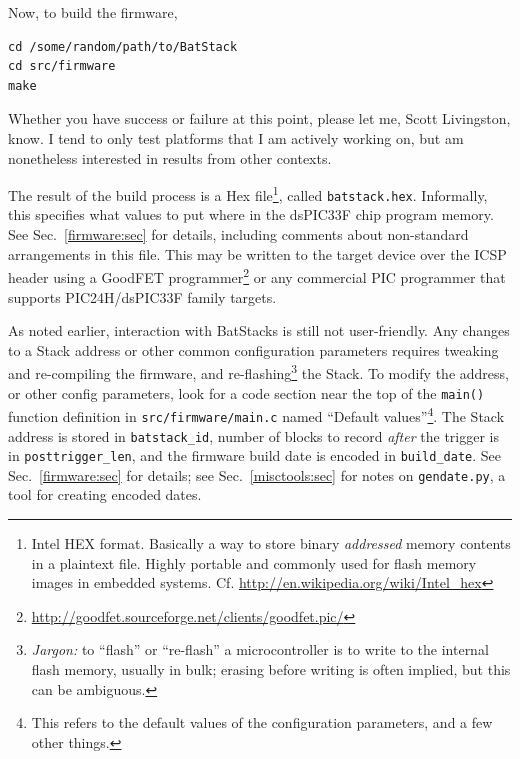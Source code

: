 \documentclass[letterpaper]{article}
\begin{document}
Now, to build the firmware,
\begin{verbatim}
cd /some/random/path/to/BatStack
cd src/firmware
make
\end{verbatim}
Whether you have success or failure at this point, please let me,
Scott Livingston, know. I tend to only test platforms that I am
actively working on, but am nonetheless interested in results from
other contexts.

The result of the build process is a Hex file\footnote{Intel HEX
  format. Basically a way to store binary \textit{addressed} memory
  contents in a plaintext file. Highly portable and commonly used for
  flash memory images in embedded
  systems. Cf. \url{http://en.wikipedia.org/wiki/Intel_hex}}, called
\texttt{batstack.hex}. Informally, this specifies what values to put
where in the dsPIC33F chip program memory. See Sec.~\ref{firmware:sec}
for details, including comments about non-standard arrangements in
this file. This may be written to the target device over the ICSP
header using a GoodFET
programmer\footnote{\url{http://goodfet.sourceforge.net/clients/goodfet.pic/}}
or any commercial PIC programmer that supports PIC24H/dsPIC33F family
targets.

As noted earlier, interaction with BatStacks is still not
user-friendly. Any changes to a Stack address or other common
configuration parameters requires tweaking and re-compiling the
firmware, and re-flashing\footnote{\textit{Jargon:} to ``flash'' or
  ``re-flash'' a microcontroller is to write to the internal flash
  memory, usually in bulk; erasing before writing is often implied,
  but this can be ambiguous.} the Stack. To modify the address, or
other config parameters, look for a code section near the top of the
\texttt{main()} function definition in \texttt{src/firmware/main.c}
named ``Default values''\footnote{This refers to the default values of
  the configuration parameters, and a few other things.}. The Stack
address is stored in \texttt{batstack\_id}, number of blocks to record
\textit{after} the trigger is in \texttt{posttrigger\_len}, and the
firmware build date is encoded in \texttt{build\_date}. See
Sec.~\ref{firmware:sec} for details; see Sec.~\ref{misctools:sec} for
notes on \texttt{gendate.py}, a tool for creating encoded dates.
\end{document}

